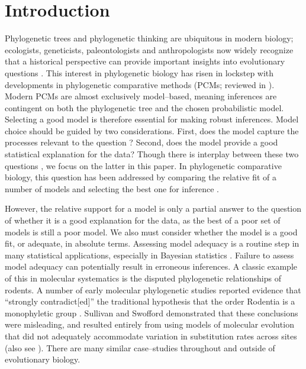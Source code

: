 \documentclass[a4paper,12pt]{article}
\begin{document}
\section{Introduction}
Phylogenetic trees and phylogenetic thinking are ubiquitous in modern biology; ecologists, geneticists, paleontologists and anthropologists now widely recognize that a historical perspective can provide important insights into evolutionary questions \citep{PennellHarmon}. This interest in phylogenetic biology has risen in lockstep with developments in phylogenetic comparative methods (PCMs; reviewed in \citep{PennellHarmon, Omeara2012}). Modern PCMs are almost exclusively model--based, meaning inferences are contingent on both the phylogenetic tree and the chosen probabilistic model. Selecting a good model is therefore essential for making robust inferences. Model choice should be guided by two considerations. First, does the model capture the processes relevant to the question \citep{HansenOrzack2005, Hansen2012, PennellPE}? Second, does the model provide a good statistical explanation for the data? Though there is interplay between these two questions \citep{Hansen2012}, we focus on the latter in this paper. In phylogenetic comparative biology, this question has been addressed by comparing the relative fit of a number of models and selecting the best one for inference \citep{Mooers1999, Harmon2010, Hunt2012}. 

However, the relative support for a model is only a partial answer to the question of whether it is a good explanation for the data, as the best of a poor set of models is still a poor model. We also must consider whether the model is a good fit, or adequate, in absolute terms. Assessing model adequacy is a routine step in many statistical applications, especially in Bayesian statistics \citep{Gelmanbook}. Failure to assess model adequacy can potentially result in erroneous inferences. A classic example of this in molecular systematics is the disputed phylogenetic relationships of rodents. A number of early molecular phylogenetic studies reported evidence that ``strongly contradict[ed]'' the traditional hypothesis that the order Rodentia is a monophyletic group \citep{Graur1991, DErchia1996}. Sullivan and Swofford \citep{SullivanSwofford} demonstrated that these conclusions were misleading, and resulted entirely from using models of molecular evolution that did not adequately accommodate variation in substitution rates across sites (also see \citep{Brown2013}). There are many similar case--studies throughout and outside of evolutionary biology.
\end{document}
